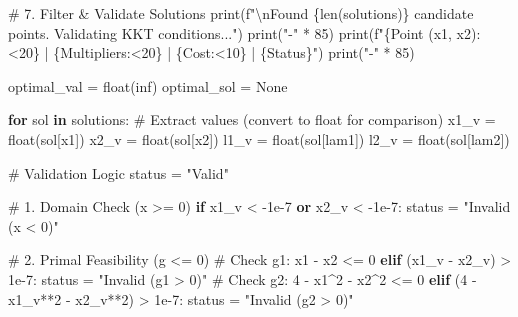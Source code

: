 \documentclass[
  letterpaper,
  DIV=11,
  numbers=noendperiod]{scrreprt}
\newenvironment{Shaded}{\begin{snugshade}}{\end{snugshade}}
\newcommand{\BuiltInTok}[1]{\textcolor[rgb]{0.00,0.23,0.31}{#1}}
\newcommand{\CharTok}[1]{\textcolor[rgb]{0.13,0.47,0.30}{#1}}
\newcommand{\CommentTok}[1]{\textcolor[rgb]{0.37,0.37,0.37}{#1}}
\newcommand{\ControlFlowTok}[1]{\textcolor[rgb]{0.00,0.23,0.31}{\textbf{#1}}}
\newcommand{\DecValTok}[1]{\textcolor[rgb]{0.68,0.00,0.00}{#1}}
\newcommand{\FloatTok}[1]{\textcolor[rgb]{0.68,0.00,0.00}{#1}}
\newcommand{\KeywordTok}[1]{\textcolor[rgb]{0.00,0.23,0.31}{\textbf{#1}}}
\newcommand{\NormalTok}[1]{\textcolor[rgb]{0.00,0.23,0.31}{#1}}
\newcommand{\OperatorTok}[1]{\textcolor[rgb]{0.37,0.37,0.37}{#1}}
\newcommand{\SpecialCharTok}[1]{\textcolor[rgb]{0.37,0.37,0.37}{#1}}
\newcommand{\SpecialStringTok}[1]{\textcolor[rgb]{0.13,0.47,0.30}{#1}}
\newcommand{\StringTok}[1]{\textcolor[rgb]{0.13,0.47,0.30}{#1}}
\newcommand{\VariableTok}[1]{\textcolor[rgb]{0.07,0.07,0.07}{#1}}
\begin{document}
\begin{Shaded}
\begin{Highlighting}[]
\CommentTok{\# 7. Filter \& Validate Solutions}
\BuiltInTok{print}\NormalTok{(}\SpecialStringTok{f"}\CharTok{\textbackslash{}n}\SpecialStringTok{Found }\SpecialCharTok{\{}\BuiltInTok{len}\NormalTok{(solutions)}\SpecialCharTok{\}}\SpecialStringTok{ candidate points. Validating KKT conditions..."}\NormalTok{)}
\BuiltInTok{print}\NormalTok{(}\StringTok{"{-}"} \OperatorTok{*} \DecValTok{85}\NormalTok{)}
\BuiltInTok{print}\NormalTok{(}\SpecialStringTok{f"}\SpecialCharTok{\{}\StringTok{\textquotesingle{}Point (x1, x2)\textquotesingle{}}\SpecialCharTok{:\textless{}20\}}\SpecialStringTok{ | }\SpecialCharTok{\{}\StringTok{\textquotesingle{}Multipliers\textquotesingle{}}\SpecialCharTok{:\textless{}20\}}\SpecialStringTok{ | }\SpecialCharTok{\{}\StringTok{\textquotesingle{}Cost\textquotesingle{}}\SpecialCharTok{:\textless{}10\}}\SpecialStringTok{ | }\SpecialCharTok{\{}\StringTok{\textquotesingle{}Status\textquotesingle{}}\SpecialCharTok{\}}\SpecialStringTok{"}\NormalTok{)}
\BuiltInTok{print}\NormalTok{(}\StringTok{"{-}"} \OperatorTok{*} \DecValTok{85}\NormalTok{)}

\NormalTok{optimal\_val }\OperatorTok{=} \BuiltInTok{float}\NormalTok{(}\StringTok{\textquotesingle{}inf\textquotesingle{}}\NormalTok{)}
\NormalTok{optimal\_sol }\OperatorTok{=} \VariableTok{None}

\ControlFlowTok{for}\NormalTok{ sol }\KeywordTok{in}\NormalTok{ solutions:}
    \CommentTok{\# Extract values (convert to float for comparison)}
\NormalTok{    x1\_v }\OperatorTok{=} \BuiltInTok{float}\NormalTok{(sol[x1])}
\NormalTok{    x2\_v }\OperatorTok{=} \BuiltInTok{float}\NormalTok{(sol[x2])}
\NormalTok{    l1\_v }\OperatorTok{=} \BuiltInTok{float}\NormalTok{(sol[lam1])}
\NormalTok{    l2\_v }\OperatorTok{=} \BuiltInTok{float}\NormalTok{(sol[lam2])}
    
    \CommentTok{\# Validation Logic}
\NormalTok{    status }\OperatorTok{=} \StringTok{"Valid"}
    
    \CommentTok{\# 1. Domain Check (x \textgreater{}= 0)}
    \ControlFlowTok{if}\NormalTok{ x1\_v }\OperatorTok{\textless{}} \OperatorTok{{-}}\FloatTok{1e{-}7} \KeywordTok{or}\NormalTok{ x2\_v }\OperatorTok{\textless{}} \OperatorTok{{-}}\FloatTok{1e{-}7}\NormalTok{:}
\NormalTok{        status }\OperatorTok{=} \StringTok{"Invalid (x \textless{} 0)"}
        
    \CommentTok{\# 2. Primal Feasibility (g \textless{}= 0)}
    \CommentTok{\# Check g1: x1 {-} x2 \textless{}= 0}
    \ControlFlowTok{elif}\NormalTok{ (x1\_v }\OperatorTok{{-}}\NormalTok{ x2\_v) }\OperatorTok{\textgreater{}} \FloatTok{1e{-}7}\NormalTok{:}
\NormalTok{        status }\OperatorTok{=} \StringTok{"Invalid (g1 \textgreater{} 0)"}
    \CommentTok{\# Check g2: 4 {-} x1\^{}2 {-} x2\^{}2 \textless{}= 0}
    \ControlFlowTok{elif}\NormalTok{ (}\DecValTok{4} \OperatorTok{{-}}\NormalTok{ x1\_v}\OperatorTok{**}\DecValTok{2} \OperatorTok{{-}}\NormalTok{ x2\_v}\OperatorTok{**}\DecValTok{2}\NormalTok{) }\OperatorTok{\textgreater{}} \FloatTok{1e{-}7}\NormalTok{:}
\NormalTok{        status }\OperatorTok{=} \StringTok{"Invalid (g2 \textgreater{} 0)"}
        

\end{Highlighting}
\end{Shaded}
\end{document}
